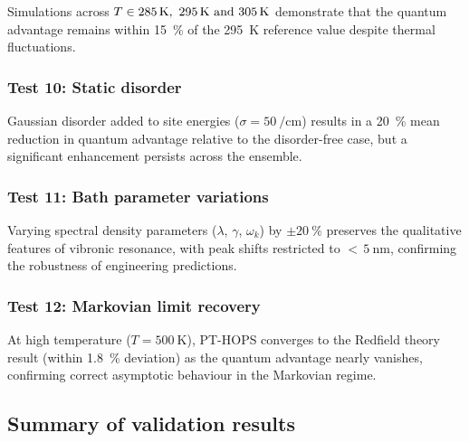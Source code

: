 \documentclass[11pt,a4paper]{article}
\begin{document}
Simulations across $T \in \SIlist{285;295;305}{\kelvin}$ demonstrate that the quantum advantage remains within \SI{15}{\percent} of the \SI{295}{\kelvin} reference value despite thermal fluctuations.

\subsubsection{Test 10: Static disorder}

Gaussian disorder added to site energies ($\sigma = \SI{50}{\per\cm}$) results in a \SI{20}{\percent} mean reduction in quantum advantage relative to the disorder-free case, but a significant enhancement persists across the ensemble.

\subsubsection{Test 11: Bath parameter variations}

Varying spectral density parameters ($\lambda$, $\gamma$, $\omega_k$) by $\pm \SI{20}{\percent}$ preserves the qualitative features of vibronic resonance, with peak shifts restricted to ${<}\,\SI{5}{\nano\meter}$, confirming the robustness of engineering predictions.

\subsubsection{Test 12: Markovian limit recovery}

At high temperature ($T = \SI{500}{\kelvin}$), PT-HOPS converges to the Redfield theory result (within \SI{1.8}{\percent} deviation) as the quantum advantage nearly vanishes, confirming correct asymptotic behaviour in the Markovian regime.

\subsection{Summary of validation results}
\end{document}
